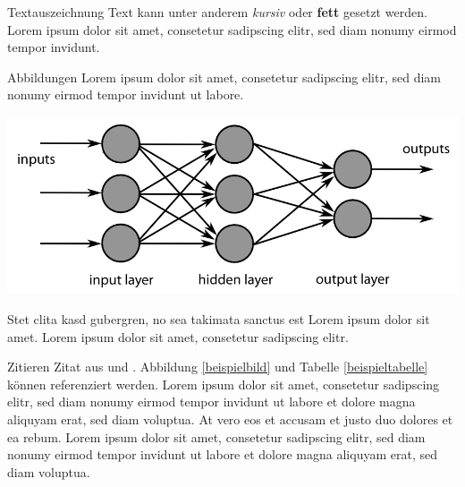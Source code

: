 \documentclass[a4paper, 10pt, twocolumn]{scrartcl}
\begin{document}

\begin{block}{Textauszeichnung}
Text kann unter anderem \emph{kursiv} oder \textbf{fett} gesetzt werden. Lorem ipsum dolor sit amet, consetetur sadipscing elitr, sed diam nonumy eirmod tempor invidunt.
\end{block}


\begin{block}{Abbildungen}
Lorem ipsum dolor sit amet, consetetur sadipscing elitr, sed diam nonumy eirmod tempor invidunt ut labore.

\begin{center}
\includegraphics[width=1.0\linewidth]{deeplearning}
\label{beispielbild}
\end{center}

Stet clita kasd gubergren, no sea takimata sanctus est Lorem ipsum dolor sit amet. Lorem ipsum dolor sit amet, consetetur sadipscing elitr.
\end{block}


\begin{block}{Zitieren}
Zitat aus \cite{scheme} und \cite[17]{knuth}. Abbildung \ref{beispielbild} und Tabelle \ref{beispieltabelle} können referenziert werden. Lorem ipsum dolor sit amet, consetetur sadipscing elitr, sed diam nonumy eirmod tempor invidunt ut labore et dolore magna aliquyam erat, sed diam voluptua. At vero eos et accusam et justo duo dolores et ea rebum. Lorem ipsum dolor sit amet, consetetur sadipscing elitr, sed diam nonumy eirmod tempor invidunt ut labore et dolore magna aliquyam erat, sed diam voluptua.
\end{block}

\end{document}
